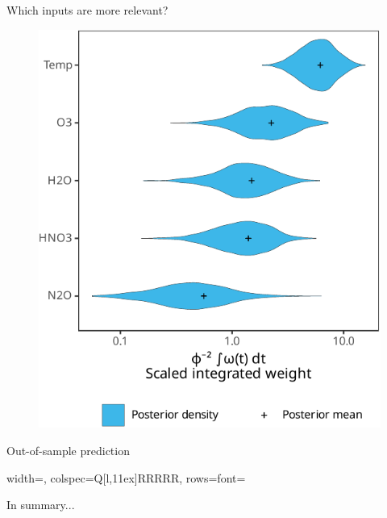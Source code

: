 \documentclass[final]{beamer}
\begin{document}
\begin{frame}[t]
{\begin{minipage}[t][76cm][t]{58cm}
      \begin{minipage}[t]{1.0\linewidth}
        \begin{minipage}[t]{.5\linewidth}
          \begin{block}{Which inputs are more relevant?}
            \begin{figure}
              \centering
              \includegraphics[width=\linewidth]{inc/mls_weight_integral.pdf}
            \end{figure}
          \end{block}
        \end{minipage}
        \begin{minipage}[t]{.5\linewidth}
          \begin{block}{Out-of-sample prediction}
            \begin{tblr}[evaluate=\fileInput]{
                width=\textwidth,
                colspec={Q[l,11ex]RRRRR},
                rows={font=\normalsize}}
            \end{tblr}
          \end{block}
          \begin{block}{In summary...}

\end{block}
\end{minipage}
\end{minipage}
\end{minipage}}
\end{frame}
\end{document}
